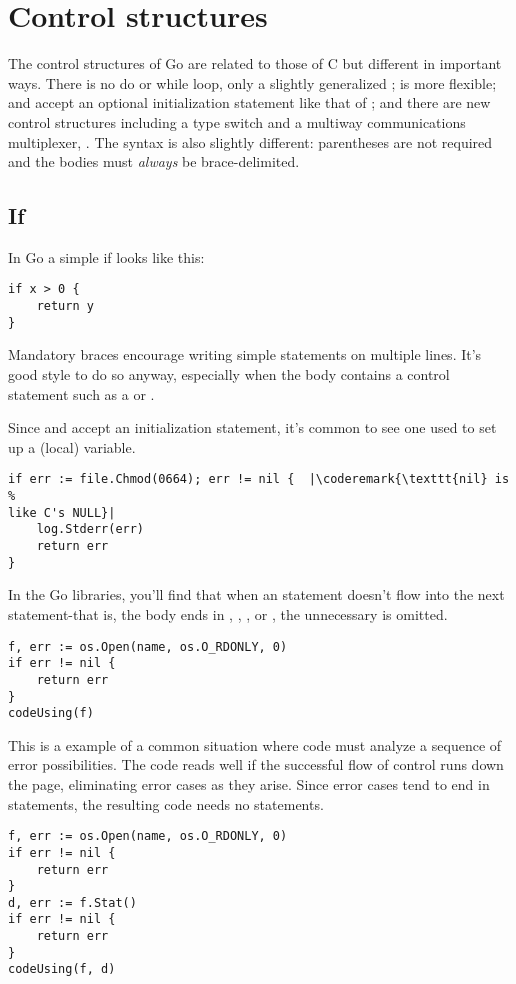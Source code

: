 \section{Control structures}
The control structures of Go are related to those of C but different in
important ways. There is no do or while loop, only a slightly
generalized ;  is more flexible;  and
 accept an
optional initialization statement like that of ; and there are new
control structures including a type switch and a multiway communications
multiplexer, . The syntax is also slightly different: parentheses
are not required and the bodies must \emph{always} be brace-delimited.

\subsection{If}
In Go a simple if looks like this:
\begin{lstlisting}
if x > 0 {
    return y
}
\end{lstlisting}
Mandatory braces encourage writing simple  statements on multiple
lines. It's good style to do so anyway, especially when the body
contains a control statement such as a  or .

Since  and  accept an initialization statement, it's common to
see one used to set up a (local) variable.
\begin{lstlisting}
if err := file.Chmod(0664); err != nil {  |\coderemark{\texttt{nil} is %
like C's NULL}|
    log.Stderr(err)
    return err
}
\end{lstlisting}
In the Go libraries, you'll find that when an  statement doesn't flow
into the next statement-that is, the body ends in ,
, ,
or , the unnecessary  is omitted.

\begin{lstlisting}
f, err := os.Open(name, os.O_RDONLY, 0)
if err != nil {
    return err
}
codeUsing(f)
\end{lstlisting}
This is a example of a common situation where code must analyze a
sequence of error possibilities. The code reads well if the successful
flow of control runs down the page, eliminating error cases as they
arise. Since error cases tend to end in  statements, the resulting
code needs no  statements.
\begin{lstlisting}
f, err := os.Open(name, os.O_RDONLY, 0)
if err != nil {
    return err
}
d, err := f.Stat()
if err != nil {
    return err
}
codeUsing(f, d)
\end{lstlisting}

